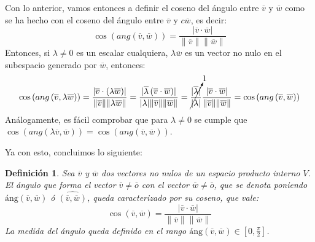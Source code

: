 \documentclass[a4paper,11pt]{article}
\theoremstyle{teoremas}
\theoremstyle{ejemplos}
\theoremstyle{definiciones}
\theoremstyle{lemas}
\newtheorem*{definicion}{Definici\'on}
\begin{document}
Con lo anterior, vamos entonces a definir el coseno del \'angulo entre $\overline{v}$ y $\overline{w}$ como se ha hecho con el coseno del \'angulo entre $\overline{v}$ y $c\overline{w}$, es decir:
\begin{equation*}
 \cos \left( ang\left( \overline{v}, \overline{w} \right) \right) = \frac{\lvert \overline{v} \cdot \overline{w} \rvert}{\lVert \overline{v} \rVert \lVert \overline{w} \rVert}
\end{equation*}
Entonces, si $\lambda \neq 0$ es un escalar cualquiera, $\lambda \overline{w}$ es un vector no nulo en el subespacio generado por $\overline{w}$, entonces:
\begin{equation}
 \cos\left( ang\left( \overline{v}, \lambda \overline{w} \right) \right) =
 \frac{\lvert \overline{v}\cdot \left( \lambda \overline{w} \right) \rvert}{\lVert \overline{v} \rVert \lVert \lambda \overline{w} \rVert} =
 \frac{\lvert \overline{\lambda} \left( \overline{v} \cdot \overline{w} \right) \rvert}{\lvert \lambda \rvert \lVert \overline{v} \rVert \lVert \overline{w} \rVert} =
 \cancelto{1}{\frac{\lvert \overline{\lambda} \rvert}{\lvert \lambda \rvert}} \frac{\lvert \overline{v} \cdot \overline{w} \rvert}{\lVert \overline{v} \rVert \lVert \overline{w} \rVert} = \cos\left( ang\left( \overline{v},\overline{w} \right) \right)
\end{equation}
An\'alogamente, es f\'acil comprobar que para $\lambda \neq 0$ se cumple que $\cos\left(ang\left( \lambda\overline{v},\overline{w} \right)\right) = \cos\left( ang\left( \overline{v}, \overline{w} \right) \right)$.
\par 
Ya con esto, concluimos lo siguiente:
\begin{definicion}
 Sea $\overline{v}$ y $\overline{w}$ dos vectores no nulos de un espacio producto interno $V$.
 El \'angulo que forma el vector $\overline{v}\neq\overline{o}$ con el vector $\overline{w}\neq \overline{o}$, que se denota poniendo $\text{\'ang}\left( \overline{v},\overline{w}\right)$ \'o $\widehat{\left( \overline{v}, \overline{w} \right)}$, queda caracterizado por su coseno, que vale:
 \begin{equation}
  \cos(\overline{v}, \overline{w}) = \frac{\lvert \overline{v}\cdot \overline{w} \rvert}{\lVert \overline{v} \rVert \lVert \overline{w} \rVert}
 \end{equation}
 La medida del \'angulo queda definido en el rango $\text{\'ang}\left( \overline{v},\overline{w}\right) \in \left[0, \frac{\pi}{2}\right]$.
\end{definicion}
\end{document}
